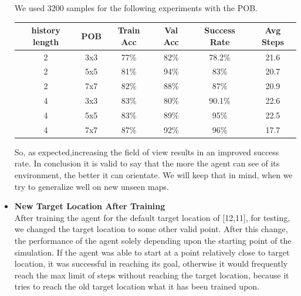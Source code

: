 \documentclass[a4paper]{article}
\begin{document}
\begin{itemize}
\begin{center}
We used 3200 samples for the following experiments with the POB.
\begin{tabular}{|c|c|c|c|c|c|}
\hline 
history length & POB & Train Acc & Val Acc & Success Rate & Avg Steps \\ 
\hline 
2 & 3x3 & 77\% & 82\% & 78.2\% & 21.6 \\ 
\hline 
2 & 5x5 & 81\% & 94\% & 83\% & 20.7 \\ 
\hline 
2 & 7x7 & 82\% & 88\% & 87\% & 20.9 \\ 
\hline
\hline 
4 & 3x3 & 83\% & 80\% & 90.1\% & 22.6 \\ 
\hline 
4 & 5x5 & 83\% & 89\% & 95\% & 22.5 \\ 
\hline 
4 & 7x7 & 87\% & 92\% & 96\% & 17.7 \\ 
\hline 
\end{tabular} 
\end{center}

So, as expected,increasing the field of view results in an improved success rate. In conclusion it is valid to say that the more the agent can see of its environment, the better it can orientate. We will keep that in mind, when we try to generalize well on new unseen maps.







\item \textbf{New Target Location After Training}\\
After training the agent for the default target location of [12,11], for testing, we changed the target location to some other valid point. After this change, the performance of the agent solely depending upon the starting point of the simulation. If the agent was able to start at a point relatively close to target location, it was successful in reaching its goal, otherwise it would frequently reach the max limit of steps without reaching the target location, because it tries to reach the old target location what it has been trained upon.


\end{itemize}
\end{document}
